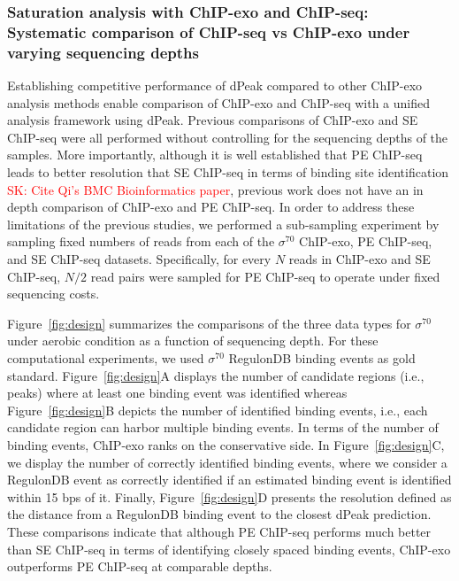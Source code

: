 \documentclass{bmcart}
\newcommand{\SK}[1]{\textcolor{red}{SK: #1}}
\newcommand{\sig}{\sigma^{70}}
\begin{document}
\subsubsection*{Saturation analysis with ChIP-exo and ChIP-seq: Systematic comparison of ChIP-seq vs ChIP-exo under
  varying sequencing depths}
Establishing competitive performance of dPeak compared to other ChIP-exo analysis methods enable comparison of ChIP-exo and ChIP-seq with a unified analysis framework using dPeak. Previous comparisons of ChIP-exo and SE ChIP-seq
were all performed without controlling for the sequencing depths of the samples. More importantly, although it is well established that PE ChIP-seq leads to better resolution that SE ChIP-seq in terms of binding site identification \SK{Cite Qi's BMC Bioinformatics paper}, previous work does not have an in depth comparison of ChIP-exo and PE ChIP-seq. 
In order to address these limitations of the
previous studies, we performed a sub-sampling experiment by sampling fixed numbers of reads from each of the
$\sig$ ChIP-exo, PE ChIP-seq, and SE ChIP-seq datasets. Specifically, for every $N$ reads in ChIP-exo and SE ChIP-seq, $N/2$ read pairs 
were sampled for PE ChIP-seq to operate under fixed sequencing costs.

Figure~\ref{fig:design} summarizes the comparisons of the three data types for $\sig$ under aerobic condition as a function of sequencing depth. For these computational experiments, we used $\sig$ RegulonDB \cite{regulondb} binding events as gold standard.
Figure~\ref{fig:design}A displays the number of candidate regions (i.e., peaks)
 where at least one  binding event was identified whereas Figure~\ref{fig:design}B depicts the number of identified binding events, i.e., each candidate region can harbor multiple binding events.
In terms of the number of  binding events, ChIP-exo ranks on the conservative side.  
In Figure~\ref{fig:design}C,  we
display the number of correctly identified binding events, where we consider a  RegulonDB event as
correctly identified if an estimated binding event is identified within 15 bps
of it. Finally, Figure~\ref{fig:design}D presents the
resolution defined as the distance from a RegulonDB binding event to the
closest dPeak prediction. These comparisons indicate that although PE ChIP-seq performs much better than SE ChIP-seq in terms of identifying closely spaced binding events, ChIP-exo outperforms PE ChIP-seq at comparable depths.
\end{document}
